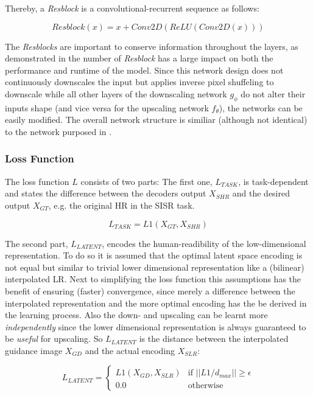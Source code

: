 Thereby, a \textit{Resblock} is a convolutional-recurrent sequence as follows:

$$Resblock(x) = x + Conv2D(ReLU(Conv2D(x)))$$

The \textit{Resblocks} are important to conserve information throughout the
layers, as demonstrated in  the number of
\textit{Resblock} has a large impact on both the performance and runtime of the
model.
\newline
Since this network design does not continuously downscales the input but
applies inverse pixel shuffeling to downscale while all other layers of the
downscaling network $g_\phi$ do not alter their inputs shape (and vice versa
for the upscaling network $f_\theta$), the networks can be easily modified.
\newline
The overall network structure is similiar (although not identical) to the
network purposed in \cite{TAID}.

\subsubsection*{Loss Function}
The loss function $L$ consists of two parts: The first one, $L_{TASK}$, is
task-dependent and states the difference between the decoders output $X_{SHR}$
and the desired output $X_{GT}$, e.g. the original \ac{HR} in the \ac{SISR} task.

$$L_{TASK} = L1(X_{GT}, X_{SHR})$$

The second part, $L_{LATENT}$, encodes the human-readibility of the low-dimensional
representation. To do so it is assumed that the optimal latent space encoding
is not equal but similar to trivial lower dimensional representation like a
(bilinear) interpolated \ac{LR}. Next to simplifying the loss function this
assumptions has the benefit of ensuring (faster) convergence, since merely a
difference between the interpolated representation and the more optimal encoding
has the be derived in the learning process. Also the down- and upscaling can be
learnt more \textit{independently} since the lower dimensional representation
is always guaranteed to be \textit{useful} for upscaling. So $L_{LATENT}$ is the
distance between the interpolated guidance image $X_{GD}$ and the
actual encoding $X_{SLR}$:

$$L_{LATENT} = \begin{cases}
L1(X_{GD}, X_{SLR}) & \text{if } ||L1/d_{max}|| \geq \epsilon
\\ 0.0 & \text{otherwise}
\end{cases}$$

